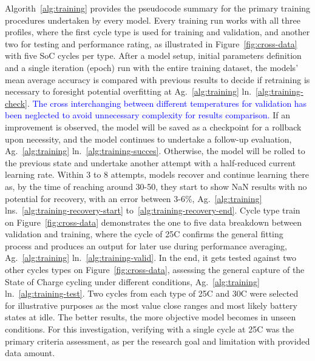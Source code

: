 %
Algorith~\ref{alg:training} provides the pseudocode summary for the primary training procedures undertaken by every model.
Every training run works with all three profiles, where the first cycle type is used for training and validation, and another two for testing and performance rating, as illustrated in Figure~\ref{fig:cross-data} with five SoC cycles per type.
After a model setup, initial parameters definition and a single iteration (epoch) run with the entire training dataset, the models' mean average accuracy is compared with previous results to decide if retraining is necessary to foresight potential overfitting at Ag.~\ref{alg:training} ln.~\ref{alg:training-check}.
\textcolor{blue}{The cross interchanging between different temperatures for validation has been neglected to avoid unnecessary complexity for results comparison.}
If an improvement is observed, the model will be saved as a checkpoint for a rollback upon necessity, and the model continues to undertake a follow-up evaluation, Ag.~\ref{alg:training} ln.~\ref{alg:training-succes}.
Otherwise, the model will be rolled to the previous state and undertake another attempt with a half-reduced current learning rate.
Within 3 to 8 attempts, models recover and continue learning there as, by the time of reaching around 30-50, they start to show NaN results with no potential for recovery, with an error between 3-6\%, Ag.~\ref{alg:training} lns.~\ref{alg:training-recovery-start} to~\ref{alg:training-recovery-end}.
Cycle type train on Figure~\ref{fig:cross-data} demonstrates the one to five data breakdown between validation and training, where the cycle of 25\textdegree{}C confirms the general fitting process and produces an output for later use during performance averaging, Ag.~\ref{alg:training} ln.~\ref{alg:training-valid}.
In the end, it gets tested against two other cycles types on Figure~\ref{fig:cross-data}, assessing the general capture of the State of Charge cycling under different conditions, Ag.~\ref{alg:training} ln.~\ref{alg:training-test}.
Two cycles from each type of 25\textdegree{}C and 30\textdegree{}C were selected for illustrative purposes as the most value close ranges and most likely battery states at idle.
The better results, the more objective model becomes in unseen conditions.
For this investigation, verifying with a single cycle at 25\textdegree{}C was the primary criteria assessment, as per the research goal and limitation with provided data amount.
